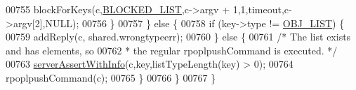 \begin{DoxyCode}
00755             blockForKeys(c,\hyperlink{server_8h_a279f6a31729ba24d6dab0944b82e0b55}{BLOCKED\_LIST},c->argv + 1,1,timeout,c->argv[2],NULL);
00756         \}
00757     \} \textcolor{keywordflow}{else} \{
00758         \textcolor{keywordflow}{if} (key->type != \hyperlink{server_8h_a4a5f22a280949c97a0cb0d4213275126}{OBJ\_LIST}) \{
00759             addReply(c, shared.wrongtypeerr);
00760         \} \textcolor{keywordflow}{else} \{
00761             \textcolor{comment}{/* The list exists and has elements, so}
00762 \textcolor{comment}{             * the regular rpoplpushCommand is executed. */}
00763             \hyperlink{server_8h_a7308f76cbff9a8d3797fe78190b91282}{serverAssertWithInfo}(c,key,listTypeLength(key) > 0);
00764             rpoplpushCommand(c);
00765         \}
00766     \}
00767 \}
\end{DoxyCode}
